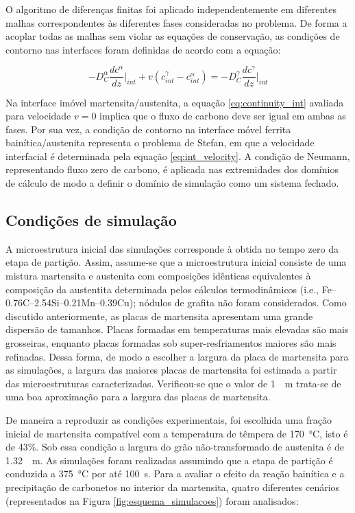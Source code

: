O algoritmo de diferenças finitas foi aplicado independentemente em diferentes malhas correspondentes às diferentes fases consideradas no problema. De forma a acoplar todas as malhas sem violar as equações de conservação, as condições de contorno nas interfaces foram definidas de acordo com a equação:

\begin{equation}
  -D_C^\alpha \frac{d c^\alpha}{d z}\Bigg|_{int} + v\left(c^\gamma_{int} - c^\alpha_{int} \right) = -D_C^\gamma \frac{d c^\gamma}{d z}\Bigg|_{int} \label{eq:continuity_int}
\end{equation}

Na interface imóvel martensita/austenita, a equação \ref{eq:continuity_int} avaliada para velocidade $v = 0$ implica que o fluxo de carbono deve ser igual em ambas as fases. Por sua vez, a condição de contorno na interface móvel ferrita bainítica/austenita representa o problema de Stefan, %
em que a velocidade interfacial é determinada pela equação \ref{eq:int_velocity}. A condição de Neumann, representando fluxo zero de carbono, é aplicada nas extremidades dos domínios de cálculo de modo a definir o domínio de simulação como um sistema fechado.

\subsection{Condições de simulação}

A microestrutura inicial das simulações corresponde à obtida no tempo zero da etapa de partição. Assim, assume-se que a microestrutura inicial consiste de uma mistura martensita e austenita com composições idênticas equivalentes à composição da austentita determinada pelos cálculos termodinâmicos (i.e., Fe--0.76C--2.54Si--0.21Mn--0.39Cu); nódulos de grafita não foram considerados. Como discutido anteriormente, as placas de martensita apresentam uma grande dispersão de tamanhos. Placas formadas em temperaturas mais elevadas são mais grosseiras, enquanto placas formadas sob super-resfriamentos maiores são mais refinadas. Dessa forma, de modo a escolher a largura da placa de martensita para as simulações, a largura das maiores placas de martensita foi estimada a partir das microestruturas caracterizadas. Verificou-se que o valor de \SI{1}{\mu m} trata-se de uma boa aproximação para a largura das placas de martensita.

De maneira a reproduzir as condições experimentais, foi escolhida uma fração inicial de martensita compatível com a temperatura de têmpera de \SI{170}{\degreeCelsius}, isto é de 43\%. Sob essa condição a largura do grão não-transformado de austenita é de \SI{1,32}{\mu m}. As simulações foram realizadas assumindo que a etapa de partição é conduzida a \SI{375}{\degreeCelsius} por até 100~s. Para a avaliar o efeito da reação bainítica e a precipitação de carbonetos no interior da martensita, quatro diferentes cenários (representados na Figura \ref{fig:esquema_simulacoes}) foram analisados:


